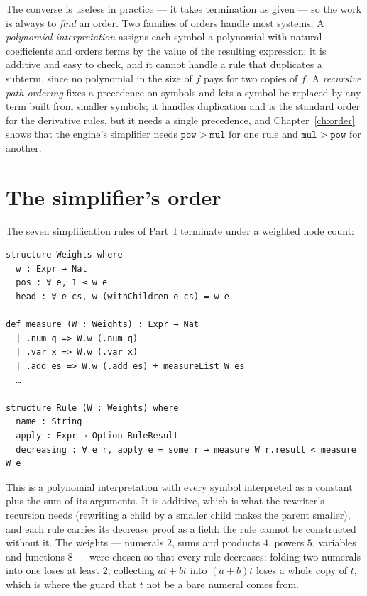 The converse is useless in practice --- it takes termination as given --- so the work is always
to \emph{find} an order. Two families of orders handle most systems. A \emph{polynomial
interpretation} assigns each symbol a polynomial with natural coefficients and orders terms by
the value of the resulting expression; it is additive and easy to check, and it cannot handle a
rule that duplicates a subterm, since no polynomial in the size of $f$ pays for two copies of
$f$. A \emph{recursive path ordering} fixes a precedence on symbols and lets a symbol be replaced
by any term built from smaller symbols; it handles duplication and is the standard order for the
derivative rules, but it needs a single precedence, and Chapter~\ref{ch:order} shows that the
engine's simplifier needs $\mathtt{pow} > \mathtt{mul}$ for one rule and $\mathtt{mul} >
\mathtt{pow}$ for another.

\section{The simplifier's order}

The seven simplification rules of Part~I terminate under a weighted node count:

\begin{verbatim}
structure Weights where
  w : Expr → Nat
  pos : ∀ e, 1 ≤ w e
  head : ∀ e cs, w (withChildren e cs) = w e

def measure (W : Weights) : Expr → Nat
  | .num q => W.w (.num q)
  | .var x => W.w (.var x)
  | .add es => W.w (.add es) + measureList W es
  …

structure Rule (W : Weights) where
  name : String
  apply : Expr → Option RuleResult
  decreasing : ∀ e r, apply e = some r → measure W r.result < measure W e
\end{verbatim}

This is a polynomial interpretation with every symbol interpreted as a constant plus the sum of
its arguments. It is additive, which is what the rewriter's recursion needs (rewriting a child
by a smaller child makes the parent smaller), and each rule carries its decrease proof as a
field: the rule cannot be constructed without it. The weights --- numerals $2$, sums and products
$4$, powers $5$, variables and functions $8$ --- were chosen so that every rule decreases:
folding two numerals into one loses at least $2$; collecting $at + bt$ into $(a+b)t$ loses a
whole copy of $t$, which is where the guard that $t$ not be a bare numeral comes from.

